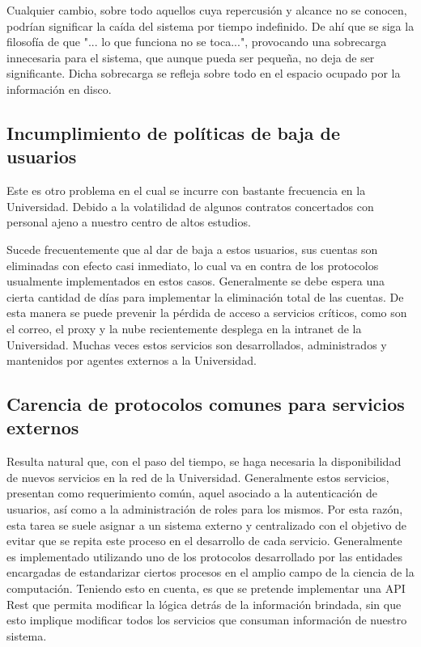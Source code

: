 Cualquier cambio, sobre todo aquellos cuya repercusión y alcance no se conocen, podrían 
significar la caída del sistema por tiempo indefinido. De ahí que se siga la filosofía de que 
"... lo que funciona no se toca...", provocando una sobrecarga innecesaria para el 
sistema, que aunque pueda ser pequeña, no deja de ser significante. Dicha sobrecarga se
refleja sobre todo en el espacio ocupado por la información en disco.

\subsection{Incumplimiento de políticas de baja de usuarios}

Este es otro problema en el cual se incurre con bastante frecuencia en la Universidad. 
Debido a la volatilidad de algunos contratos concertados con personal ajeno a nuestro 
centro de altos estudios. 

Sucede frecuentemente que al dar de baja a estos usuarios, sus cuentas son eliminadas con 
efecto casi inmediato, lo cual va en contra de los protocolos usualmente implementados en 
estos casos. Generalmente se debe espera una cierta cantidad de días para implementar la 
eliminación total de las cuentas. De esta manera se puede prevenir la pérdida de acceso a 
servicios críticos, como son el correo, el proxy y la nube recientemente desplega en la 
intranet de la Universidad. Muchas veces estos servicios son desarrollados, administrados 
y mantenidos por agentes externos a la Universidad. 


\subsection{Carencia de protocolos comunes para servicios externos}

Resulta natural que, con el paso del tiempo, se haga necesaria la disponibilidad de nuevos 
servicios en la red de la Universidad. Generalmente estos servicios, presentan como 
requerimiento común, aquel asociado a la autenticación de usuarios, así como a la 
administración de roles para los mismos. Por esta razón, esta tarea se suele asignar a un 
sistema externo y centralizado con el objetivo de evitar que se repita este 
proceso en el desarrollo de cada servicio. Generalmente es implementado utilizando uno de 
los protocolos desarrollado por las entidades encargadas de estandarizar ciertos procesos 
en el amplio campo de la ciencia de la computación. Teniendo esto en cuenta, es que se 
pretende implementar una API Rest que permita modificar la lógica detrás de la 
información brindada, sin que esto implique modificar todos los servicios que consuman 
información de nuestro sistema.







